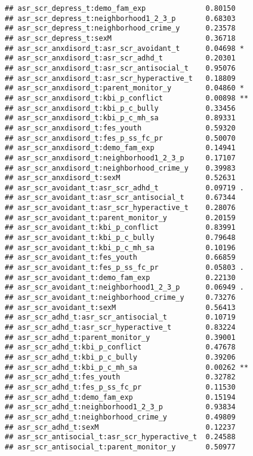 \documentclass[
]{article}
\begin{document}
\begin{verbatim}
## asr_scr_depress_t:demo_fam_exp              0.80150    
## asr_scr_depress_t:neighborhood1_2_3_p       0.68303    
## asr_scr_depress_t:neighborhood_crime_y      0.23578    
## asr_scr_depress_t:sexM                      0.36718    
## asr_scr_anxdisord_t:asr_scr_avoidant_t      0.04698 *  
## asr_scr_anxdisord_t:asr_scr_adhd_t          0.20301    
## asr_scr_anxdisord_t:asr_scr_antisocial_t    0.95076    
## asr_scr_anxdisord_t:asr_scr_hyperactive_t   0.18809    
## asr_scr_anxdisord_t:parent_monitor_y        0.04860 *  
## asr_scr_anxdisord_t:kbi_p_conflict          0.00898 ** 
## asr_scr_anxdisord_t:kbi_p_c_bully           0.33456    
## asr_scr_anxdisord_t:kbi_p_c_mh_sa           0.89331    
## asr_scr_anxdisord_t:fes_youth               0.59320    
## asr_scr_anxdisord_t:fes_p_ss_fc_pr          0.50070    
## asr_scr_anxdisord_t:demo_fam_exp            0.14941    
## asr_scr_anxdisord_t:neighborhood1_2_3_p     0.17107    
## asr_scr_anxdisord_t:neighborhood_crime_y    0.39983    
## asr_scr_anxdisord_t:sexM                    0.52631    
## asr_scr_avoidant_t:asr_scr_adhd_t           0.09719 .  
## asr_scr_avoidant_t:asr_scr_antisocial_t     0.67344    
## asr_scr_avoidant_t:asr_scr_hyperactive_t    0.28076    
## asr_scr_avoidant_t:parent_monitor_y         0.20159    
## asr_scr_avoidant_t:kbi_p_conflict           0.83991    
## asr_scr_avoidant_t:kbi_p_c_bully            0.79648    
## asr_scr_avoidant_t:kbi_p_c_mh_sa            0.10196    
## asr_scr_avoidant_t:fes_youth                0.66859    
## asr_scr_avoidant_t:fes_p_ss_fc_pr           0.05803 .  
## asr_scr_avoidant_t:demo_fam_exp             0.22130    
## asr_scr_avoidant_t:neighborhood1_2_3_p      0.06949 .  
## asr_scr_avoidant_t:neighborhood_crime_y     0.73276    
## asr_scr_avoidant_t:sexM                     0.56413    
## asr_scr_adhd_t:asr_scr_antisocial_t         0.10719    
## asr_scr_adhd_t:asr_scr_hyperactive_t        0.83224    
## asr_scr_adhd_t:parent_monitor_y             0.39001    
## asr_scr_adhd_t:kbi_p_conflict               0.47678    
## asr_scr_adhd_t:kbi_p_c_bully                0.39206    
## asr_scr_adhd_t:kbi_p_c_mh_sa                0.00262 ** 
## asr_scr_adhd_t:fes_youth                    0.32782    
## asr_scr_adhd_t:fes_p_ss_fc_pr               0.11530    
## asr_scr_adhd_t:demo_fam_exp                 0.15194    
## asr_scr_adhd_t:neighborhood1_2_3_p          0.93834    
## asr_scr_adhd_t:neighborhood_crime_y         0.49809    
## asr_scr_adhd_t:sexM                         0.12237    
## asr_scr_antisocial_t:asr_scr_hyperactive_t  0.24588    
## asr_scr_antisocial_t:parent_monitor_y       0.50977    

\end{verbatim}
\end{document}
